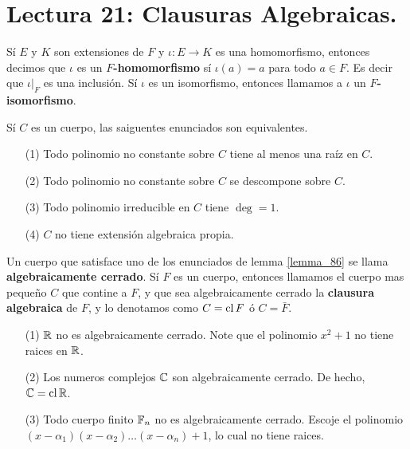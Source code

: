 \section*{Lectura 21: Clausuras Algebraicas.}

\begin{definition}
    S\'i $E$ y  $K$ son extensiones de $F$ y $\iota:E \xrightarrow{} K$ es una
    homomorfismo, entonces decimos que $\iota$ es un \textbf{$F$-homomorfismo}
    s\'i $\iota(a)=a$ para todo $a \in F$. Es decir que $\iota|_F$ es una
    inclusi\'on. S\'i $\iota$ es un isomorfismo, entonces llamamos a $\iota$ un
    \textbf{$F$-isomorfismo}.
\end{definition}

\begin{lemma}\label{lemma_86}
    S\'i $C$ es un cuerpo, las saiguentes enunciados son equivalentes.
    \begin{enumerate}
         \item[(1)] Todo polinomio no constante sobre $C$ tiene al menos una
             ra\'iz en $C$.

         \item[(2)] Todo polinomio no constante sobre $C$ se descompone sobre
             $C$.

         \item[(3)] Todo polinomio irreducible en $C$ tiene $\deg=1$.

         \item[(4)] $C$ no tiene extensi\'on algebraica propia.
    \end{enumerate}
\end{lemma}

\begin{definition}
    Un cuerpo que satisface uno de los enunciados de lemma \ref{lemma_86} se
    llama \textbf{algebraicamente cerrado}. S\'i $F$ es un cuerpo, entonces
    llamamos el cuerpo mas peque\~no  $C$ que contine a  $F$, y que sea
    algebraicamente cerrado la  \textbf{clausura algebraica} de $F$, y lo
    denotamos como  $C=\operatorname{cl}{F}$ \'o $C=\bar{F}$.
\end{definition}

\begin{example}\label{}
    \begin{enumerate}
        \item[(1)] $\mathbb{R}$ no es algebraicamente cerrado. Note que el polinomio
            $x^2+1$ no tiene raices en $\mathbb{R}$.

        \item[(2)] Los numeros complejos $\mathbb{C}$ son algebraicamente cerrado. De
            hecho, $\mathbb{C}=\operatorname{cl}{\mathbb{R}}$.

        \item[(3)] Todo cuerpo finito $\mathbb{F}_{n}$ no es algebraicamente cerrado.
            Escoje el polinomio $(x-\alpha_1)(x-\alpha_2) \dots (x-\alpha_n)+1$,
            lo cual no tiene raices.
    \end{enumerate}
\end{example}

